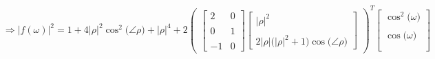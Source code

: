 \documentclass{article}
\begin{document}
\begin{align*}
    &\Rightarrow |f(\omega)|^{2} = 1 + 4\big|\rho\big|^{2}\cos^{2}\big(\angle{\rho}\big) + \big|\rho\big|^{4} + 2\begin{pmatrix}
                                                                                                                    \begin{bmatrix}
                                                                                                                         2 & 0 \\ \\
                                                                                                                         0 & 1 \\ \\
                                                                                                                        -1 & 0
                                                                                                                      \end{bmatrix}
                                                                                                                    \begin{bmatrix}
                                                                                                                        \big|\rho\big|^{2} \\ \\
                                                                                                                        2\big|\rho\big|\Big(\big|\rho\big|^{2} + 1\Big)\cos\big(\angle{\rho}\big)
                                                                                                                      \end{bmatrix}
                                                                                                                  \end{pmatrix}^{T}
                                                                                                                \begin{bmatrix}
                                                                                                                    \cos^{2}\big(\omega\big) \\ \\
                                                                                                                    \cos\big(\omega\big) \\ \\

\end{bmatrix}
\end{align*}
\end{document}
